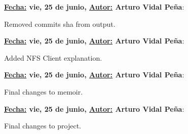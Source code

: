 \item \textbf{\underline{Fecha:} vie, 25 de junio, \underline{Autor:} Arturo Vidal Peña}:\\\item[] Removed commits sha from output.\\
\item \textbf{\underline{Fecha:} vie, 25 de junio, \underline{Autor:} Arturo Vidal Peña}:\\\item[] Added NFS Client explanation.\\
\item \textbf{\underline{Fecha:} vie, 25 de junio, \underline{Autor:} Arturo Vidal Peña}:\\\item[] Final changes to memoir.\\
\item \textbf{\underline{Fecha:} vie, 25 de junio, \underline{Autor:} Arturo Vidal Peña}:\\\item[] Final changes to project.\\
